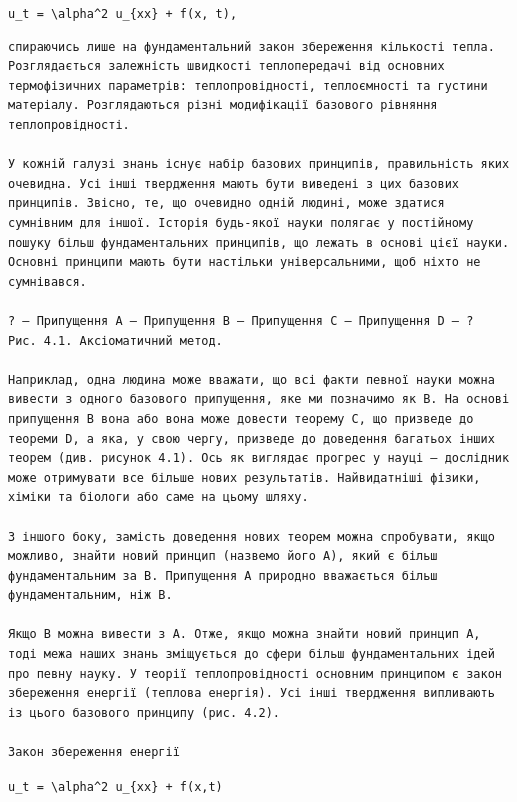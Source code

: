 \documentclass[
  ukrainian,
]{article}
\begin{document}
\texttt{u\_t\ =\ \textbackslash{}alpha\^{}2\ u\_\{xx\}\ +\ f(x,\ t),}

\begin{verbatim}
спираючись лише на фундаментальний закон збереження кількості тепла. Розглядається залежність швидкості теплопередачі від основних термофізичних параметрів: теплопровідності, теплоємності та густини матеріалу. Розглядаються різні модифікації базового рівняння теплопровідності.

У кожній галузі знань існує набір базових принципів, правильність яких очевидна. Усі інші твердження мають бути виведені з цих базових принципів. Звісно, те, що очевидно одній людині, може здатися сумнівним для іншої. Історія будь-якої науки полягає у постійному пошуку більш фундаментальних принципів, що лежать в основі цієї науки. Основні принципи мають бути настільки універсальними, щоб ніхто не сумнівався.

? — Припущення A — Припущення B — Припущення C — Припущення D — ?
Рис. 4.1. Аксіоматичний метод.

Наприклад, одна людина може вважати, що всі факти певної науки можна вивести з одного базового припущення, яке ми позначимо як B. На основі припущення B вона або вона може довести теорему C, що призведе до теореми D, а яка, у свою чергу, призведе до доведення багатьох інших теорем (див. рисунок 4.1). Ось як виглядає прогрес у науці — дослідник може отримувати все більше нових результатів. Найвидатніші фізики, хіміки та біологи або саме на цьому шляху.

З іншого боку, замість доведення нових теорем можна спробувати, якщо можливо, знайти новий принцип (назвемо його A), який є більш фундаментальним за B. Припущення A природно вважається більш фундаментальним, ніж B.

Якщо B можна вивести з A. Отже, якщо можна знайти новий принцип A, тоді межа наших знань зміщується до сфери більш фундаментальних ідей про певну науку. У теорії теплопровідності основним принципом є закон збереження енергії (теплова енергія). Усі інші твердження випливають із цього базового принципу (рис. 4.2).

Закон збереження енергії
\end{verbatim}

\texttt{u\_t\ =\ \textbackslash{}alpha\^{}2\ u\_\{xx\}\ +\ f(x,t)}
\end{document}
